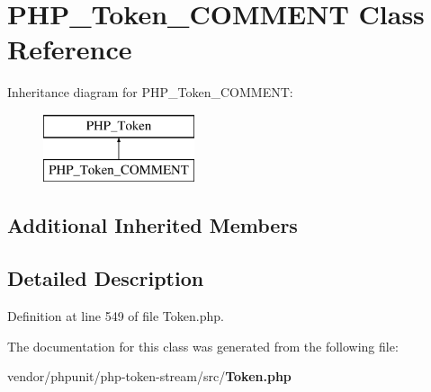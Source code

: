 \section{P\+H\+P\+\_\+\+Token\+\_\+\+C\+O\+M\+M\+E\+N\+T Class Reference}
\label{class_p_h_p___token___c_o_m_m_e_n_t}
Inheritance diagram for P\+H\+P\+\_\+\+Token\+\_\+\+C\+O\+M\+M\+E\+N\+T\+:\begin{figure}[H]
\begin{center}
\leavevmode
\includegraphics[height=2.000000cm]{class_p_h_p___token___c_o_m_m_e_n_t}
\end{center}
\end{figure}
\subsection*{Additional Inherited Members}


\subsection{Detailed Description}


Definition at line 549 of file Token.\+php.



The documentation for this class was generated from the following file\+:\begin{DoxyCompactItemize}
\item 
vendor/phpunit/php-\/token-\/stream/src/{\bf Token.\+php}\end{DoxyCompactItemize}
